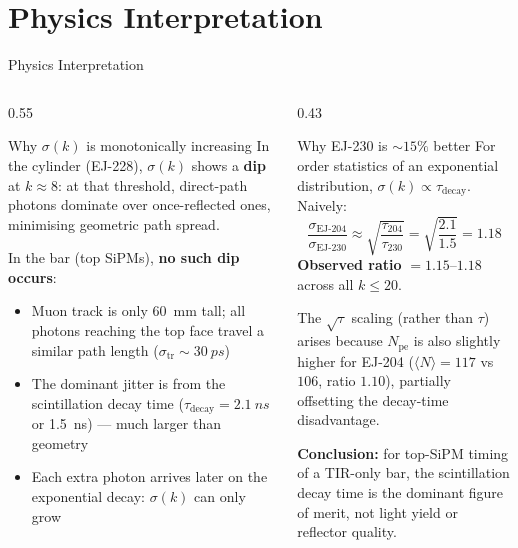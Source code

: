 \documentclass[aspectratio=169,10pt]{beamer}
\begin{document}
\section{Physics Interpretation}

\begin{frame}{Physics Interpretation}

\begin{columns}[T]

  \begin{column}{0.55\textwidth}

  \begin{block}{Why $\sigma(k)$ is monotonically increasing}
  \small
  In the cylinder (EJ-228), $\sigma(k)$ shows a \textbf{dip} at $k\approx8$:
  at that threshold, direct-path photons dominate over once-reflected ones,
  minimising geometric path spread.

  \medskip
  In the bar (top SiPMs), \textbf{no such dip occurs}:
  \begin{itemize}
    \item Muon track is only \SI{60}{mm} tall; all photons reaching the top
          face travel a similar path length ($\sigma_\text{tr}\!\sim\SI{30}{ps}$)
    \item The dominant jitter is from the scintillation decay time
          ($\tau_\text{decay}=\SI{2.1}{ns}$ or \SI{1.5}{ns}) --- much larger
          than geometry
    \item Each extra photon arrives later on the exponential decay:
          $\sigma(k)$ can only grow
  \end{itemize}
  \end{block}

  \end{column}

  \begin{column}{0.43\textwidth}

  \begin{block}{Why EJ-230 is $\sim\!15\%$ better}
  \small
  For order statistics of an exponential distribution,
  $\sigma(k) \propto \tau_\text{decay}$.
  Naively:
  \[
    \frac{\sigma_\text{EJ-204}}{\sigma_\text{EJ-230}}
    \approx \sqrt{\frac{\tau_{204}}{\tau_{230}}}
    = \sqrt{\frac{2.1}{1.5}} = 1.18
  \]
  \textbf{Observed ratio} $= 1.15$--$1.18$ across all $k \leq 20$.

  \medskip
  The $\sqrt{\tau}$ scaling (rather than $\tau$) arises because
  $N_\text{pe}$ is also slightly higher for EJ-204
  ($\langle N\rangle=117$ vs $106$, ratio $1.10$),
  partially offsetting the decay-time disadvantage.
  \end{block}

  \vspace{0.4em}
  {\footnotesize
  \textbf{Conclusion:} for top-SiPM timing of a TIR-only bar,
  the scintillation decay time is the dominant figure of merit,
  not light yield or reflector quality.
  }

  \end{column}
\end{columns}

\end{frame}
\end{document}
